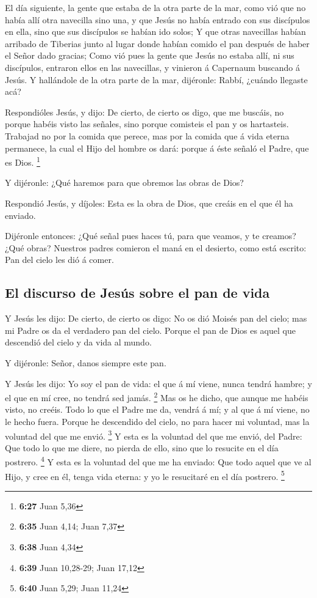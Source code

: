  El día siguiente, la gente que estaba de la otra parte
de la mar, como vió que no había allí otra navecilla sino una, y que
Jesús no había entrado con sus discípulos en ella, sino que sus
discípulos se habían ido solos;  Y que otras navecillas
habían arribado de Tiberias junto al lugar donde habían comido el pan
después de haber el Señor dado gracias;  Como vió pues la
gente que Jesús no estaba allí, ni sus discípulos, entraron ellos en las
navecillas, y vinieron á Capernaum buscando á Jesús.  Y
hallándole de la otra parte de la mar, dijéronle: Rabbí, ¿cuándo
llegaste acá?

 Respondióles Jesús, y dijo: De cierto, de cierto os
digo, que me buscáis, no porque habéis visto las señales, sino porque
comisteis el pan y os hartasteis.  Trabajad no por la
comida que perece, mas por la comida que á vida eterna permanece, la
cual el Hijo del hombre os dará: porque á éste señaló el Padre, que es
Dios. \footnote{\textbf{6:27} Juan 5,36}

 Y dijéronle: ¿Qué haremos para que obremos las obras de
Dios?

 Respondió Jesús, y díjoles: Esta es la obra de Dios, que
creáis en el que él ha enviado.

 Dijéronle entonces: ¿Qué señal pues haces tú, para que
veamos, y te creamos? ¿Qué obras?  Nuestros padres
comieron el maná en el desierto, como está escrito: Pan del cielo les
dió á comer.

\hypertarget{el-discurso-de-jesuxfas-sobre-el-pan-de-vida}{%
\subsection{El discurso de Jesús sobre el pan de
vida}\label{el-discurso-de-jesuxfas-sobre-el-pan-de-vida}}

 Y Jesús les dijo: De cierto, de cierto os digo: No os
dió Moisés pan del cielo; mas mi Padre os da el verdadero pan del cielo.
 Porque el pan de Dios es aquel que descendió del cielo y
da vida al mundo.

 Y dijéronle: Señor, danos siempre este pan.

 Y Jesús les dijo: Yo soy el pan de vida: el que á mí
viene, nunca tendrá hambre; y el que en mí cree, no tendrá sed jamás.
\footnote{\textbf{6:35} Juan 4,14; Juan 7,37}  Mas os he
dicho, que aunque me habéis visto, no creéis.  Todo lo
que el Padre me da, vendrá á mí; y al que á mí viene, no le hecho fuera.
 Porque he descendido del cielo, no para hacer mi
voluntad, mas la voluntad del que me envió. \footnote{\textbf{6:38} Juan
  4,34}  Y esta es la voluntad del que me envió, del
Padre: Que todo lo que me diere, no pierda de ello, sino que lo resucite
en el día postrero. \footnote{\textbf{6:39} Juan 10,28-29; Juan 17,12}
 Y esta es la voluntad del que me ha enviado: Que todo
aquel que ve al Hijo, y cree en él, tenga vida eterna: y yo le
resucitaré en el día postrero. \footnote{\textbf{6:40} Juan 5,29; Juan
  11,24}

